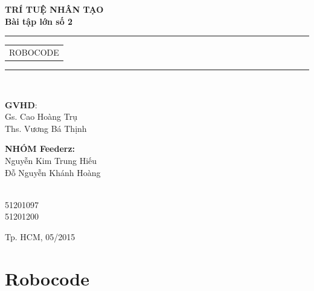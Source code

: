 \documentclass[14pt]{article}
\begin{document}
\vspace{1cm}

\begin{flushleft}
\Large \bfseries TRÍ TUỆ NHÂN TẠO\\
Bài tập lớn số 2\\[0.5cm]
\end{flushleft}
\rule{\textwidth}{1pt}
\vspace{2pt}
\begin{center}
\huge
\begin{tabular}{@{}l}
ROBOCODE\\[10pt]
\end{tabular}
\end{center}
\rule{\textwidth}{1pt}\\[1cm]

\vspace{1cm}

\begin{minipage}[t]{0.60\linewidth}
\textbf{GVHD}: \\
Gs. Cao Hoàng Trụ\\
Ths. Vương Bá Thịnh

\end{minipage}
\begin{minipage}[t]{0.25\linewidth}
\textbf{NHÓM Feederz:}\\
Nguyễn Kim Trung Hiếu\\
Đỗ Nguyễn Khánh Hoàng\\
\end{minipage}
\begin{minipage}[t]{0.20\linewidth}
\textbf{}\\
51201097\\
51201200\\
\end{minipage}
\begin{center}

\vspace{2cm}
{Tp. HCM, 05/2015}

\end{center}

\newpage
\thispagestyle{empty}
\tableofcontents
\thispagestyle{empty}

\newpage
\thispagestyle{empty}
\listoffigures

\newpage
\section{Robocode}
\end{document}
